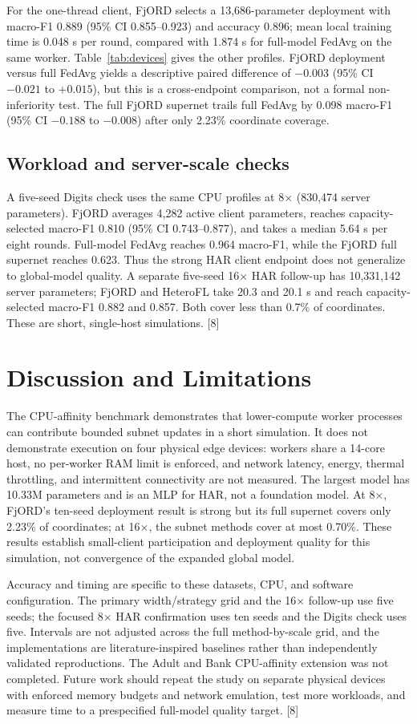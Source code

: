 \documentclass[conference]{IEEEtran}
\begin{document}
For the one-thread client, FjORD selects a 13,686-parameter deployment with macro-F1 0.889 (95\% CI 0.855--0.923) and accuracy 0.896; mean local training time is 0.048 s per round, compared with 1.874 s for full-model FedAvg on the same worker. Table~\ref{tab:devices} gives the other profiles. FjORD deployment versus full FedAvg yields a descriptive paired difference of $-0.003$ (95\% CI $-0.021$ to $+0.015$), but this is a cross-endpoint comparison, not a formal non-inferiority test. The full FjORD supernet trails full FedAvg by 0.098 macro-F1 (95\% CI $-0.188$ to $-0.008$) after only 2.23\% coordinate coverage.

\subsection{Workload and server-scale checks}
A five-seed Digits check uses the same CPU profiles at 8$\times$ (830,474 server parameters). FjORD averages 4,282 active client parameters, reaches capacity-selected macro-F1 0.810 (95\% CI 0.743--0.877), and takes a median 5.64 s per eight rounds. Full-model FedAvg reaches 0.964 macro-F1, while the FjORD full supernet reaches 0.623. Thus the strong HAR client endpoint does not generalize to global-model quality. A separate five-seed 16$\times$ HAR follow-up has 10,331,142 server parameters; FjORD and HeteroFL take 20.3 and 20.1 s and reach capacity-selected macro-F1 0.882 and 0.857. Both cover less than 0.7\% of coordinates. These are short, single-host simulations. [8]

\section{Discussion and Limitations}
The CPU-affinity benchmark demonstrates that lower-compute worker processes can contribute bounded subnet updates in a short simulation. It does not demonstrate execution on four physical edge devices: workers share a 14-core host, no per-worker RAM limit is enforced, and network latency, energy, thermal throttling, and intermittent connectivity are not measured. The largest model has 10.33M parameters and is an MLP for HAR, not a foundation model. At 8$\times$, FjORD's ten-seed deployment result is strong but its full supernet covers only 2.23\% of coordinates; at 16$\times$, the subnet methods cover at most 0.70\%. These results establish small-client participation and deployment quality for this simulation, not convergence of the expanded global model.

Accuracy and timing are specific to these datasets, CPU, and software configuration. The primary width/strategy grid and the 16$\times$ follow-up use five seeds; the focused 8$\times$ HAR confirmation uses ten seeds and the Digits check uses five. Intervals are not adjusted across the full method-by-scale grid, and the implementations are literature-inspired baselines rather than independently validated reproductions. The Adult and Bank CPU-affinity extension was not completed. Future work should repeat the study on separate physical devices with enforced memory budgets and network emulation, test more workloads, and measure time to a prespecified full-model quality target. [8]
\end{document}

